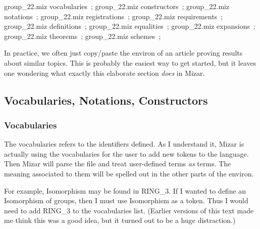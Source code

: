  \LA{}\code{}group{\_}22.miz\edoc{} vocabularies~{\nwtagstyle{}}\RA{};
 \LA{}\code{}group{\_}22.miz\edoc{} constructors~{\nwtagstyle{}}\RA{};
 \LA{}\code{}group{\_}22.miz\edoc{} notations~{\nwtagstyle{}}\RA{};
 \LA{}\code{}group{\_}22.miz\edoc{} registrations~{\nwtagstyle{}}\RA{};
 \LA{}\code{}group{\_}22.miz\edoc{} requirements~{\nwtagstyle{}}\RA{};
 \LA{}\code{}group{\_}22.miz\edoc{} definitions~{\nwtagstyle{}}\RA{};
 \LA{}\code{}group{\_}22.miz\edoc{} equalities~{\nwtagstyle{}}\RA{};
 \LA{}\code{}group{\_}22.miz\edoc{} expansions~{\nwtagstyle{}}\RA{};
 \LA{}\code{}group{\_}22.miz\edoc{} theorems~{\nwtagstyle{}}\RA{};
 \LA{}\code{}group{\_}22.miz\edoc{} schemes~{\nwtagstyle{}}\RA{};
\nwendcode{}\nwdocspar

\begin{remark}
In practice, we often just copy/paste the {\Tt{}environ\nwendquote} of an article
proving results about similar topics. This is probably the easiest way
to get started, but it leaves one wondering what exactly this elaborate
section \emph{does} in Mizar.
\end{remark}

\subsection{Vocabularies, Notations, Constructors}

\subsubsection{Vocabularies}\label{par:characteristic:vocabularies}
The {\Tt{}vocabularies\nwendquote} refers to the identifiers defined. As I understand
it, Mizar is actually using the {\Tt{}vocabularies\nwendquote} for the user to add new
tokens to the language. Then Mizar will parse the file and treat
user-defined terms \emph{as} terms. The meaning associated to them will
be spelled out in the other parts of the {\Tt{}environ\nwendquote}.

For example, {\Tt{}Isomorphism\nwendquote} may be found in {\Tt{}RING{\_}3\nwendquote}. If I wanted to
define an {\Tt{}Isomorphism\nwendquote} of groups, then I must use {\Tt{}Isomorphism\nwendquote} as
a token. Thus I would need to add {\Tt{}RING{\_}3\nwendquote} to the vocabularies list.
(Earlier versions of this text made me think this was a good idea, but
it turned out to be a huge distraction.)

